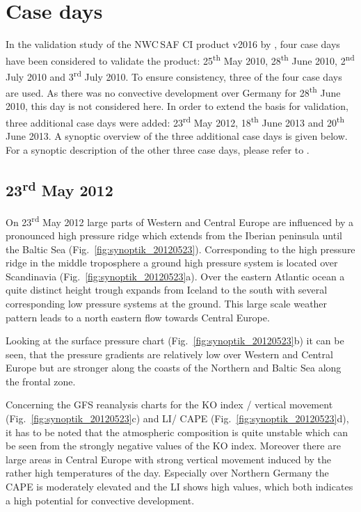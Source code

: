 \section{Case days}
In the validation study of the NWC\,SAF CI product v2016 by \citet{Karagiannidis2016}, four case days have been considered to validate the product: 25\textsuperscript{th} May 2010, 28\textsuperscript{th} June 2010, 2\textsuperscript{nd} July 2010 and 3\textsuperscript{rd} July 2010. To ensure consistency, three of the four case days are used. As there was no convective development over Germany for 28\textsuperscript{th} June 2010, this day is not considered here. In order to extend the basis for validation, three additional case days were added: 23\textsuperscript{rd} May 2012, 18\textsuperscript{th} June 2013 and 20\textsuperscript{th} June 2013. A synoptic overview of the three additional case days is given below. For a synoptic description of the other three case days, please refer to \citet{Karagiannidis2016}.

\subsection{23\textsuperscript{rd} May 2012}
On 23\textsuperscript{rd} May 2012 large parts of Western and Central Europe are influenced by a pronounced high pressure ridge which extends from the Iberian peninsula until the Baltic Sea (Fig.~\ref{fig:synoptik_20120523}). Corresponding to the high pressure ridge in the middle troposphere a ground high pressure system is located over Scandinavia (Fig.~\ref{fig:synoptik_20120523}a). Over the eastern Atlantic ocean a quite distinct height trough expands from Iceland to the south with several corresponding low pressure systems at the ground. This large scale weather pattern leads to a north eastern flow towards Central Europe. 

Looking at the surface pressure chart (Fig.~\ref{fig:synoptik_20120523}b) it can be seen, that the pressure gradients are relatively low over Western and Central Europe but are stronger along the coasts of the Northern and Baltic Sea along the frontal zone. 

Concerning the GFS reanalysis charts for the KO index / vertical movement (Fig.~\ref{fig:synoptik_20120523}c) and LI/ CAPE (Fig.~\ref{fig:synoptik_20120523}d), it has to be noted that the atmospheric composition is quite unstable which can be seen from the strongly negative values of the KO index. Moreover there are large areas in Central Europe with strong vertical movement induced by the rather high temperatures of the day. Especially over Northern Germany the CAPE is moderately elevated and the LI shows high values, which both indicates a high potential for convective development.

